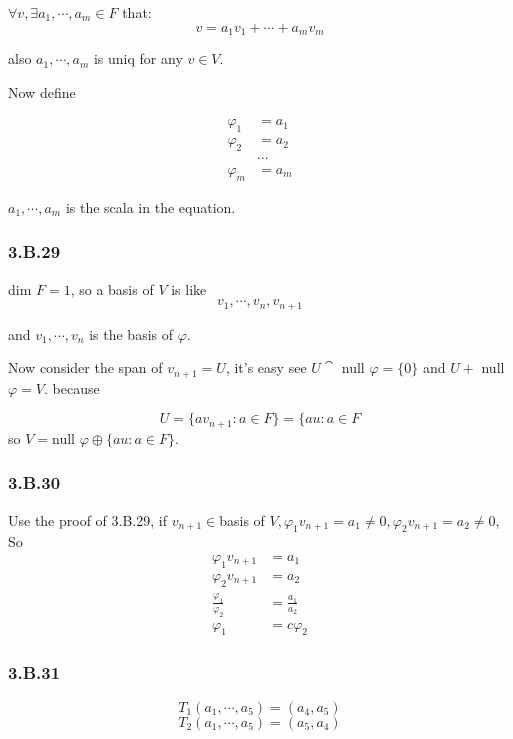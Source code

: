 $\forall v, \exists a_{1},\cdots, a_{m}\in F$ that:
\[v = a_{1}v_{1} + \cdots + a_{m}v_{m}\]

also $a_{1},\cdots,a_{m}$ is uniq for any $v\in V$.

Now define

\begin{equation*}
    \begin{split}
\varphi_{1} &= a_{1} \\
\varphi_{2} &= a_{2} \\
&\cdots \\
\varphi_{m} &= a_{m}
\end{split}
\end{equation*}

$a_{1}, \cdots, a_{m}$ is the scala in the equation.

\subsubsection*{3.B.29}

dim $F = 1$, so a basis of $V$ is like
\[v_{1},\cdots,v_{n}, v_{n+1}\]

and $v_{1},\cdots, v_{n}$ is the basis of $\varphi$. 

Now consider the span of $v_{n+1} = U$, it's easy see $U \cat $ null $\varphi = \{0\}$ and $U + $ null $\varphi = V$. because

\[U = \{av_{n+1}: a\in F\} = \{au: a\in F\]
so $V = $null $\varphi \oplus \{au:a \in F\}$.

\subsubsection*{3.B.30}
Use the proof of 3.B.29, if $v_{n+1}\in $basis of $V,\varphi_{1}v_{n+1} = a_{1} \neq 0, \varphi_{2}v_{n+1} = a_{2} \neq 0$,  So 
\begin{equation*}
    \begin{split}
\varphi_{1}v_{n+1} &= a_{1} \\
\varphi_{2}v_{n+1} &= a_{2} \\
\frac{\varphi_{1}}{\varphi_{2}} & = \frac{a_{1}}{a_{2}} \\
\varphi_{1} &= c\varphi_{2}
\end{split}
\end{equation*}

\subsubsection*{3.B.31}
\[T_{1}(a_{1}, \cdots, a_{5}) = (a_{4}, a_{5})\]
\[T_{2}(a_{1}, \cdots, a_{5}) = (a_{5}, a_{4})\]

